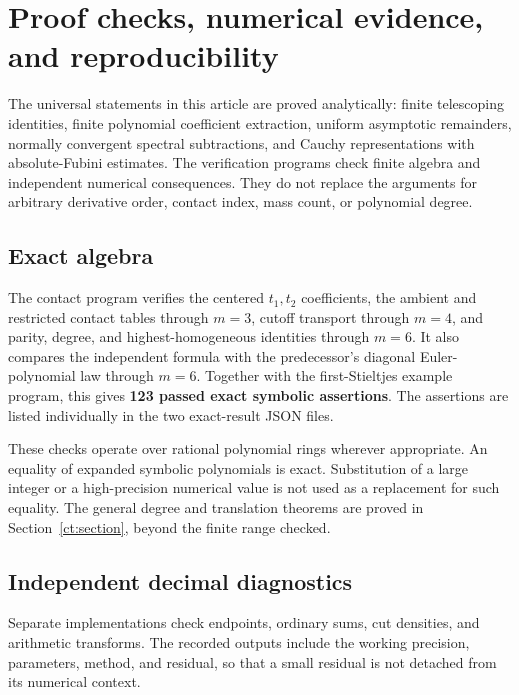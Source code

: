 \section{Proof checks, numerical evidence, and reproducibility}
\label{vf:section}

The universal statements in this article are proved analytically:
finite telescoping identities, finite polynomial coefficient extraction,
uniform asymptotic remainders, normally convergent spectral subtractions,
and Cauchy representations with absolute-Fubini estimates. The verification
programs check finite algebra and independent numerical consequences.
They do not replace the arguments for arbitrary derivative order, contact
index, mass count, or polynomial degree.

\subsection{Exact algebra}

The contact program verifies the centered \(t_1,t_2\) coefficients, the
ambient and restricted contact tables through \(m=3\), cutoff transport
through \(m=4\), and parity, degree, and highest-homogeneous identities
through \(m=6\). It also compares the independent formula with the
predecessor's diagonal Euler-polynomial law through \(m=6\).
Together with the first-Stieltjes example program, this gives
\textbf{123 passed exact symbolic assertions}. The assertions are listed
individually in the two exact-result JSON files.

These checks operate over rational polynomial rings wherever appropriate.
An equality of expanded symbolic polynomials is exact. Substitution of a
large integer or a high-precision numerical value is not used as a
replacement for such equality. The general degree and translation theorems
are proved in Section~\ref{ct:section}, beyond the finite range checked.

\subsection{Independent decimal diagnostics}

Separate implementations check endpoints, ordinary sums, cut densities,
and arithmetic transforms. The recorded outputs include the working
precision, parameters, method, and residual, so that a small residual
is not detached from its numerical context.

